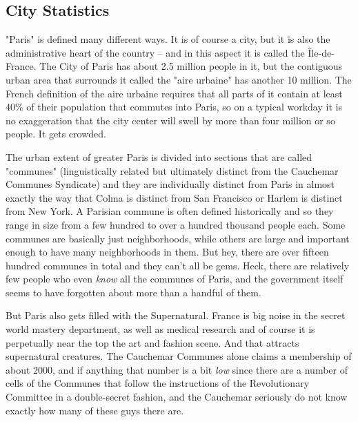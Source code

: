 \subsection{City Statistics}

\hspace{\parindent} "Paris" is defined many different ways. It is of course a city, but it is also the administrative heart of the country -- and in this aspect it is called the \^{I}le-de-France. The City of Paris has about 2.5 million people in it, but the contiguous urban area that surrounds it called the "aire urbaine" has another 10 million. The French definition of the aire urbaine requires that all parts of it contain at least 40\% of their population that commutes into Paris, so on a typical workday it is no exaggeration that the city center will swell by more than four million or so people. It gets crowded.

The urban extent of greater Paris is divided into sections that are called "communes" (linguistically related but ultimately distinct from the Cauchemar Communes Syndicate) and they are individually distinct from Paris in almost exactly the way that Colma is distinct from San Francisco or Harlem is distinct from New York. A Parisian commune is often defined historically and so they range in size from a few hundred to over a hundred thousand people each. Some communes are basically just neighborhoods, while others are large and important enough to have many neighborhoods in them. But hey, there are over fifteen hundred communes in total and they can't all be gems. Heck, there are relatively few people who even \textit{know} all the communes of Paris, and the government itself seems to have forgotten about more than a handful of them.

But Paris also gets filled with the Supernatural. France is big noise in the secret world mastery department, as well as medical research and of course it is perpetually near the top the art and fashion scene. And that attracts supernatural creatures. The Cauchemar Communes alone claims a membership of about 2000, and if anything that number is a bit \textit{low} since there are a number of cells of the Communes that follow the instructions of the Revolutionary Committee in a double-secret fashion, and the Cauchemar seriously do not know exactly how many of these guys there are.

